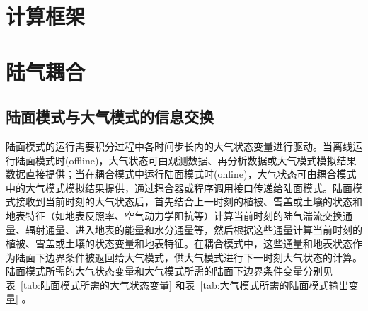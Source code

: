 \section{计算框架}\label{计算框架}



\section{陆气耦合}\label{陆气耦合}
\subsection{陆面模式与大气模式的信息交换}
陆面模式的运行需要积分过程中各时间步长内的大气状态变量进行驱动。当离线运行陆面模式时(offline)，大气状态可由观测数据、再分析数据或大气模式模拟结果数据直接提供；当在耦合模式中运行陆面模式时(online)，大气状态可由耦合模式中的大气模式模拟结果提供，通过耦合器或程序调用接口传递给陆面模式。陆面模式接收到当前时刻的大气状态后，首先结合上一时刻的植被、雪盖或土壤的状态和地表特征（如地表反照率、空气动力学阻抗等）计算当前时刻的陆气湍流交换通量、辐射通量、进入地表的能量和水分通量等，然后根据这些通量计算当前时刻的植被、雪盖或土壤的状态变量和地表特征。在耦合模式中，这些通量和地表状态作为陆面下边界条件被返回给大气模式，供大气模式进行下一时刻大气状态的计算。陆面模式所需的大气状态变量和大气模式所需的陆面下边界条件变量分别见表~\ref{tab:陆面模式所需的大气状态变量} 和表~\ref{tab:大气模式所需的陆面模式输出变量} 。


